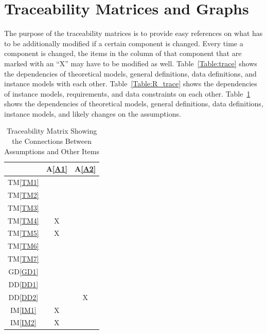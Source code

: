 \documentclass[12pt]{article}
\newcommand{\dref}[1]{GD\ref{#1}}
\newcommand{\ddref}[1]{DD\ref{#1}}
\newcommand{\tref}[1]{TM\ref{#1}}
\newcommand{\aref}[1]{A\ref{#1}}
\newcommand{\iref}[1]{IM\ref{#1}}
\begin{document}
\section{Traceability Matrices and Graphs}

The purpose of the traceability matrices is to provide easy references on what
has to be additionally modified if a certain component is changed.  Every time a
component is changed, the items in the column of that component that are marked
with an ``X'' may have to be modified as well.  Table~\ref{Table:trace} shows the
dependencies of theoretical models, general definitions, data definitions, and
instance models with each other. Table~\ref{Table:R_trace} shows the
dependencies of instance models, requirements, and data constraints on each
other. Table~\ref{Table:A_trace} shows the dependencies of theoretical models,
general definitions, data definitions, instance models, and likely changes on
the assumptions.

\begin{table}[h!]
\centering
\begin{tabular}{|c|c|c|}
\hline
            & \aref{A1} & \aref{A2} \\
\hline
\tref{TM1}  &           &           \\ \hline
\tref{TM2}  &           &           \\ \hline
\tref{TM3}  &           &           \\ \hline
\tref{TM4}  &     X     &           \\ \hline
\tref{TM5}  &     X     &           \\ \hline
\tref{TM6}  &           &           \\ \hline
\tref{TM7}  &           &           \\ \hline
\dref{GD1}  &           &           \\ \hline
\ddref{DD1} &           &           \\ \hline
\ddref{DD2} &           &     X     \\ \hline
\iref{IM1}  &     X     &           \\ \hline
\iref{IM2}  &     X     &           \\ \hline
\end{tabular}
\caption{Traceability Matrix Showing the Connections Between Assumptions and Other Items}
\label{Table:A_trace}
\end{table}

\newpage
\end{document}
